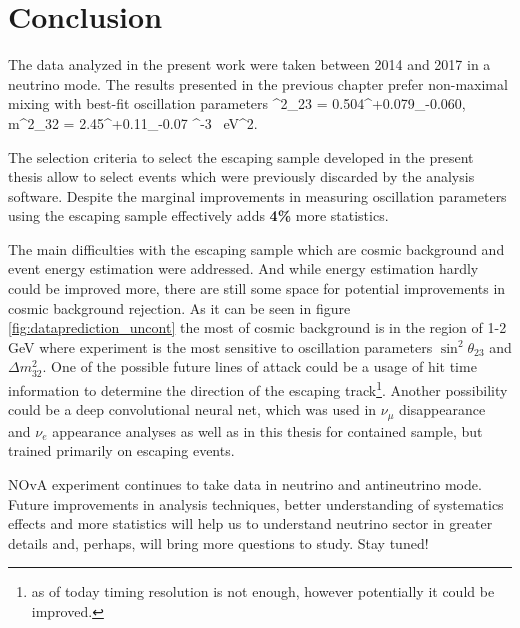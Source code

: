 \chapter{Conclusion}
\label{conclusion_chapter}

The data analyzed in the present work were taken between 2014 and 2017 in a neutrino mode. The results 
presented in the previous chapter prefer non-maximal mixing with best-fit oscillation parameters 
\be
\sin^2\theta_{23} = 0.504^{+0.079}_{-0.060}, \nn
\ee
\be
\Delta m^2_{32} = 2.45^{+0.11}_{-0.07} ^{-3}~ eV^2. \nn
\ee

The selection criteria to select the escaping sample developed in the present thesis allow to select
events which were previously discarded by the analysis software. Despite the marginal improvements in measuring
oscillation parameters using the escaping sample effectively adds \textbf{4\%} more statistics.

The main difficulties with the escaping sample which are cosmic background and event energy estimation were 
addressed. And while energy estimation hardly could be improved more, there are still some space for potential 
improvements in cosmic background rejection. As it can be seen in figure \ref{fig:dataprediction_uncont} the most 
of cosmic background is in the region of 1-2 GeV where experiment is the most sensitive to oscillation 
parameters $\sin^2\theta_{23}$ and $\Delta m^2_{32}$. One of the possible future lines of attack could be a
usage of hit time information to determine the direction of the escaping track\footnote{as of today timing resolution
is not enough, however potentially it could be improved.}. Another possibility could be a deep convolutional neural
net, which was used in $\nu_\mu$ disappearance and $\nu_e$ appearance analyses as well as in this thesis for contained sample,
but trained primarily on escaping events. 

NOvA experiment continues to take data in neutrino and antineutrino mode. Future improvements in analysis techniques,
better understanding of systematics effects and more statistics will help us to understand neutrino sector in greater details 
and, perhaps, will bring more questions to study. Stay tuned!

